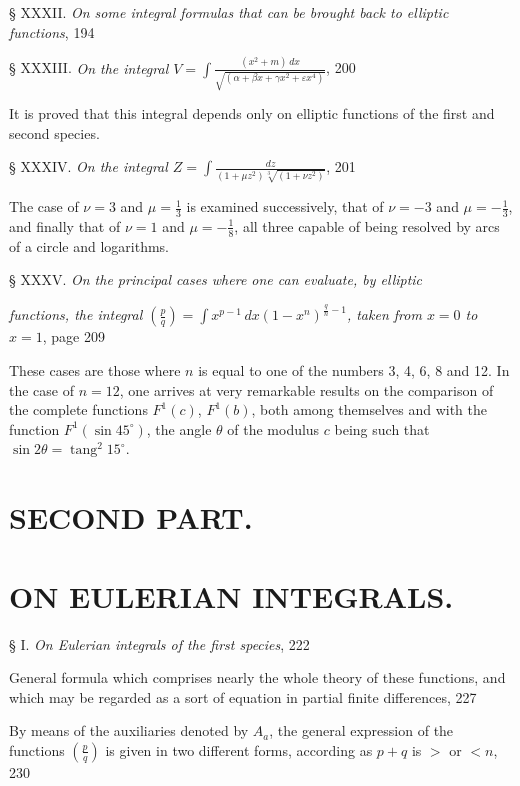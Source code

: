 \documentclass{article}
\begin{document}
§ XXXII. \emph{On some integral formulas that can be brought back to elliptic functions}, 194

§ XXXIII. \emph{On the integral $\displaystyle V=\int\frac{(x^{2}+m)\,dx}{\sqrt{(\alpha+\beta x+\gamma x^{2}+\varepsilon x^{4})}}$}, 200

It is proved that this integral depends only on elliptic functions of the first and second species.

§ XXXIV. \emph{On the integral $\displaystyle Z=\int\frac{dz}{(1+\mu z^{2})\sqrt[3]{(1+\nu z^{2})}}$}, 201

The case of $\nu=3$ and $\mu=\frac{1}{3}$ is examined successively, that of $\nu=-3$ and $\mu=-\frac{1}{3}$, and finally that of $\nu=1$ and $\mu=-\frac{1}{8}$, all three capable of being resolved by arcs of a circle and logarithms.

§ XXXV. \emph{On the principal cases where one can evaluate, by elliptic}

\emph{functions, the integral $\left(\frac{p}{q}\right)=\displaystyle\int x^{p-1}\,dx(1-x^{n})^{\frac{q}{n}-1}$, taken from $x=0$ to $x=1$}, page 209

These cases are those where $n$ is equal to one of the numbers 3, 4, 6, 8 and 12. In the case of $n=12$, one arrives at very remarkable results on the comparison of the complete functions $F^{1}(c)$, $F^{1}(b)$, both among themselves and with the function $F^{1}(\sin 45^{\circ})$, the angle $\theta$ of the modulus $c$ being such that $\sin 2\theta=\operatorname{tang}^{2}15^{\circ}$.

\section*{SECOND PART.}

\section*{ON EULERIAN INTEGRALS.}

§ I. \emph{On Eulerian integrals of the first species}, 222

General formula which comprises nearly the whole theory of these functions, and which may be regarded as a sort of equation in partial finite differences, 227

By means of the auxiliaries denoted by $A_{a}$, the general expression of the functions $\left(\frac{p}{q}\right)$ is given in two different forms, according as $p+q$ is $>$ or $<n$, 230
\end{document}
